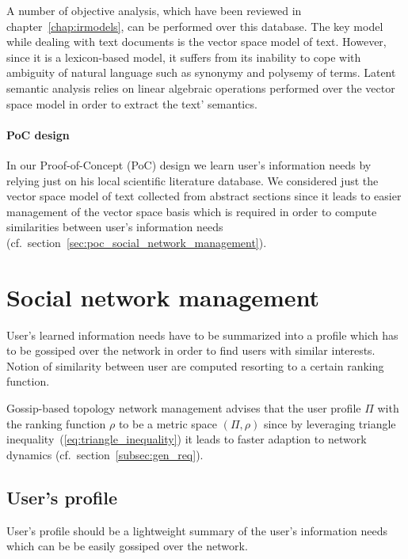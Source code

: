 A number of objective analysis, which have been reviewed in chapter~\ref{chap:irmodels}, can be performed over this database. The key model while dealing with text documents is the vector space model of text. However, since it is a lexicon-based model, it suffers from its inability to cope with ambiguity of natural language such as synonymy and polysemy of terms. Latent semantic analysis relies on linear algebraic operations performed over the vector space model in order to extract the text' semantics.

\paragraph{PoC design} In our Proof-of-Concept (PoC) design we learn user's information needs by relying just on his local scientific literature database. We considered just the vector space model of text collected from abstract sections since it leads to easier management of the vector space basis which is required in order to compute similarities between user's information needs (cf.\ section~\ref{sec:poc_social_network_management}).

\section{\label{sec:poc_social_network_management}Social network management}
User's learned information needs have to be summarized into a profile which has to be gossiped over the network in order to find users with similar interests. Notion of similarity between user are computed resorting to a certain ranking function.

Gossip-based topology network management advises that the user profile $\Pi$ with the ranking function $\rho$ to be a metric space $(\Pi,\rho)$ since by leveraging triangle inequality~(\ref{eq:triangle_inequality}) it leads to faster adaption to network dynamics (cf.\ section~\ref{subsec:gen_req}).

\subsection{User's profile}
User's profile should be a lightweight summary of the user's information needs which can be be easily gossiped over the network.


